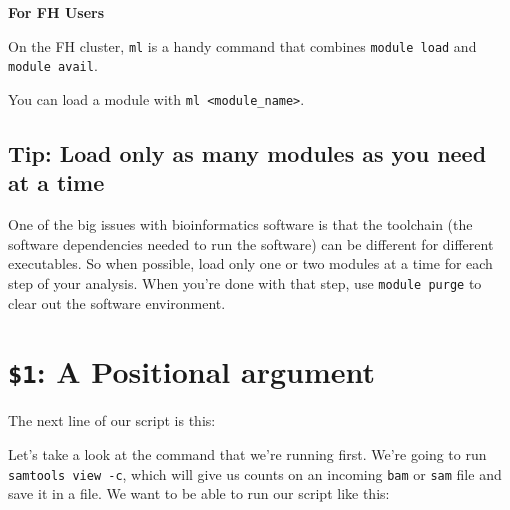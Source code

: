 \documentclass[
  letterpaper,
  DIV=11,
  numbers=noendperiod]{scrreprt}
\newenvironment{Shaded}{\begin{snugshade}}{\end{snugshade}}
\newcommand{\AttributeTok}[1]{\textcolor[rgb]{0.40,0.45,0.13}{#1}}
\newcommand{\ExtensionTok}[1]{\textcolor[rgb]{0.00,0.23,0.31}{#1}}
\newcommand{\NormalTok}[1]{\textcolor[rgb]{0.00,0.23,0.31}{#1}}
\newcommand{\OperatorTok}[1]{\textcolor[rgb]{0.37,0.37,0.37}{#1}}
\newcommand{\VariableTok}[1]{\textcolor[rgb]{0.07,0.07,0.07}{#1}}
\begin{document}
\begin{tcolorbox}[enhanced jigsaw, breakable, leftrule=.75mm, colframe=quarto-callout-color-frame, left=2mm, toprule=.15mm, arc=.35mm, rightrule=.15mm, opacityback=0, bottomrule=.15mm, colback=white]

\vspace{-3mm}\textbf{For FH Users}\vspace{3mm}

On the FH cluster, \texttt{ml} is a handy command that combines
\texttt{module\ load} and \texttt{module\ avail}.

You can load a module with
\texttt{ml\ \textless{}module\_name\textgreater{}}.

\end{tcolorbox}

\subsection{Tip: Load only as many modules as you need at a
time}\label{tip-load-only-as-many-modules-as-you-need-at-a-time}

One of the big issues with bioinformatics software is that the toolchain
(the software dependencies needed to run the software) can be different
for different executables. So when possible, load only one or two
modules at a time for each step of your analysis. When you're done with
that step, use \texttt{module\ purge} to clear out the software
environment.

\section{\texorpdfstring{\texttt{\$1}: A Positional
argument}{\$1: A Positional argument}}\label{sec-positional}

The next line of our script is this:

\begin{Shaded}
\end{Shaded}

Let's take a look at the command that we're running first. We're going
to run \texttt{samtools\ view\ -c}, which will give us counts on an
incoming \texttt{bam} or \texttt{sam} file and save it in a file. We
want to be able to run our script like this:
\end{document}
